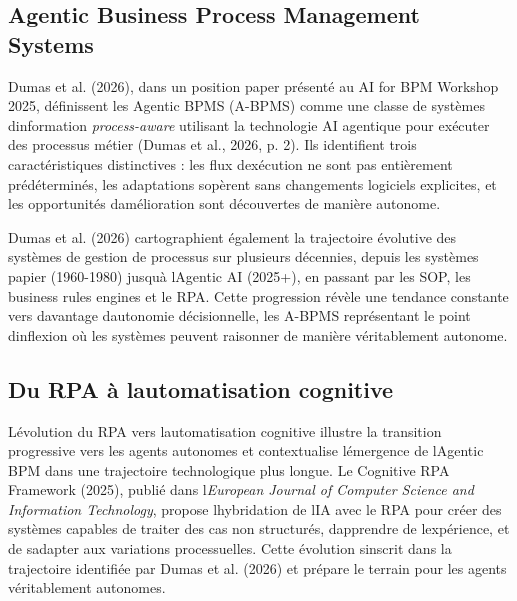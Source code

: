 \documentclass[12pt,a4paper]{article}
\begin{document}
\subsection{Agentic Business Process Management
Systems}\label{agentic-business-process-management-systems}

Dumas et al. (2026), dans un position paper présenté au AI for BPM
Workshop 2025, définissent les Agentic BPMS (A-BPMS) comme une classe de
systèmes d\textquotesingle information \emph{process-aware} utilisant la
technologie AI agentique pour exécuter des processus métier (Dumas et
al., 2026, p. 2). Ils identifient trois caractéristiques distinctives :
les flux d\textquotesingle exécution ne sont pas entièrement
prédéterminés, les adaptations s\textquotesingle opèrent sans
changements logiciels explicites, et les opportunités
d\textquotesingle amélioration sont découvertes de manière autonome.

Dumas et al. (2026) cartographient également la trajectoire évolutive
des systèmes de gestion de processus sur plusieurs décennies, depuis les
systèmes papier (1960-1980) jusqu\textquotesingle à
l\textquotesingle Agentic AI (2025+), en passant par les SOP, les
business rules engines et le RPA. Cette progression révèle une tendance
constante vers davantage d\textquotesingle autonomie décisionnelle, les
A-BPMS représentant le point d\textquotesingle inflexion où les systèmes
peuvent raisonner de manière véritablement autonome.

\subsection{Du RPA à l\textquotesingle automatisation
cognitive}\label{du-rpa-uxe0-lautomatisation-cognitive}

L\textquotesingle évolution du RPA vers l\textquotesingle automatisation
cognitive illustre la transition progressive vers les agents autonomes
et contextualise l\textquotesingle émergence de
l\textquotesingle Agentic BPM dans une trajectoire technologique plus
longue. Le Cognitive RPA Framework (2025), publié dans
l\textquotesingle{}\emph{European Journal of Computer Science and
Information Technology}, propose l\textquotesingle hybridation de
l\textquotesingle IA avec le RPA pour créer des systèmes capables de
traiter des cas non structurés, d\textquotesingle apprendre de
l\textquotesingle expérience, et de s\textquotesingle adapter aux
variations processuelles. Cette évolution s\textquotesingle inscrit dans
la trajectoire identifiée par Dumas et al. (2026) et prépare le terrain
pour les agents véritablement autonomes.
\end{document}
